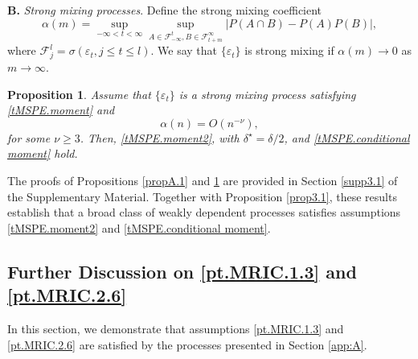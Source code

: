 \documentclass[ejsv2]{imsart}
\theoremstyle{plain}
\newtheorem{proposition}{Proposition}[section]
\theoremstyle{definition}
\theoremstyle{remark}
\begin{document}
{\bf B.} {\it Strong mixing processes}.
Define the strong mixing coefficient
$$\alpha(m)=\sup\limits_{-\infty<t<\infty}\sup\limits_{A\in\mathcal{F}_{-\infty}^t,B\in\mathcal{F}_{t+m}^\infty}|P(A\cap B)-P(A)P(B)|,$$
where $\mathcal{F}_j^l=\sigma(\varepsilon_t,j\leq t\leq l)$. We say that $\{\varepsilon_t\}$ is strong mixing if $\alpha(m)\to0$ as $m\to\infty$.

\begin{proposition}\label{propA.2}
Assume that $\{\varepsilon_t\}$ is a strong mixing process satisfying \eqref{tMSPE.moment} 
and 
\begin{equation}\label{propA.2.3}
\alpha(n)=O(n^{-{\nu}}),
\end{equation}
for some $\nu\geq3$. Then, \eqref{tMSPE.moment2},
with $\delta^\star={\delta}/2$, and \eqref{tMSPE.conditional moment} hold.
\end{proposition}

The proofs of Propositions \ref{propA.1} and \ref{propA.2} are provided in Section \ref{supp3.1} of the Supplementary Material. %
Together with Proposition \ref{prop3.1}, these results establish that
a broad class of weakly dependent processes satisfies
assumptions \eqref{tMSPE.moment2} and \eqref{tMSPE.conditional moment}.


\subsection{Further Discussion on \eqref{pt.MRIC.1.3} and \eqref{pt.MRIC.2.6}}\label{appA00}
In this section, we demonstrate that assumptions \eqref{pt.MRIC.1.3} and \eqref{pt.MRIC.2.6} 
are satisfied by the processes presented in Section
\ref{app:A}.


\end{document}
